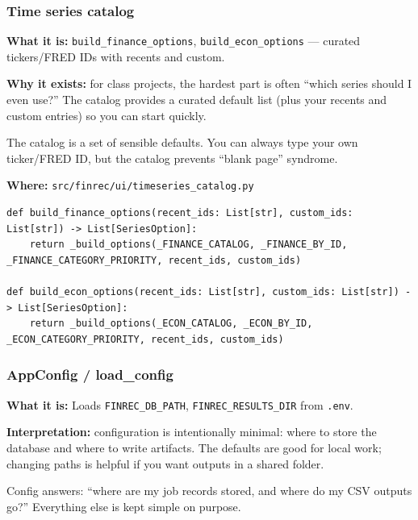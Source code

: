 \documentclass[11pt,a4paper]{article}
\begin{document}
\subsubsection{Time series catalog}\label{sec:catalog}

\textbf{What it is:} \texttt{build\_finance\_options}, \texttt{build\_econ\_options} --- curated tickers/FRED IDs with recents and custom.

\textbf{Why it exists:} for class projects, the hardest part is often ``which series should I even use?'' The catalog provides a curated default list (plus your recents and custom entries) so you can start quickly.

\begin{intuitionbox}
The catalog is a set of sensible defaults. You can always type your own ticker/FRED ID, but the catalog prevents ``blank page'' syndrome.
\end{intuitionbox}

\textbf{Where:} \texttt{src/finrec/ui/timeseries\_catalog.py}

\begin{lstlisting}
def build_finance_options(recent_ids: List[str], custom_ids: List[str]) -> List[SeriesOption]:
    return _build_options(_FINANCE_CATALOG, _FINANCE_BY_ID, _FINANCE_CATEGORY_PRIORITY, recent_ids, custom_ids)

def build_econ_options(recent_ids: List[str], custom_ids: List[str]) -> List[SeriesOption]:
    return _build_options(_ECON_CATALOG, _ECON_BY_ID, _ECON_CATEGORY_PRIORITY, recent_ids, custom_ids)
\end{lstlisting}

\subsubsection{AppConfig / load\_config}\label{sec:config}

\textbf{What it is:} Loads \texttt{FINREC\_DB\_PATH}, \texttt{FINREC\_RESULTS\_DIR} from \texttt{.env}.

\textbf{Interpretation:} configuration is intentionally minimal: where to store the database and where to write artifacts. The defaults are good for local work; changing paths is helpful if you want outputs in a shared folder.

\begin{intuitionbox}
Config answers: ``where are my job records stored, and where do my CSV outputs go?'' Everything else is kept simple on purpose.
\end{intuitionbox}
\end{document}
